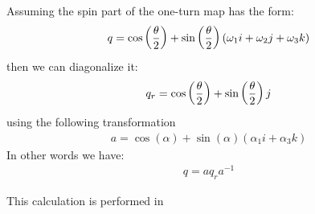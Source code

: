 \documentclass{hitec}     %
\begin{document}
{{{{{{Assuming the spin part of the one-turn map has the form:
%
\begin{align} q=
\cos\left({{\theta  \over 2}}\right)+\sin\left({{\theta  \over 2}}\right)\left({{\omega }_{1}i+{\omega }_{2}j+{\omega }_{3}k}\right) \label{eq:quatmap}\end{align}
then we can diagonalize it:
%
\begin{align} {q}_{r}=
\cos\left({{\theta  \over 2}}\right)+\sin\left({{\theta  \over 2}}\right)j \label{eq:quatmapj}\end{align}
using the following transformation
%
\begin{align} a=
\cos\left({\alpha }\right)+\sin\left({\alpha }\right)\left({{\alpha }_{1}i+{\alpha }_{3}k}\right) \label{eq:quas}\end{align}
In other words we have:
%
\begin{align} q=
a{q}_{r}{a}^{-1} \end{align}

This calculation is performed in \vn{c_normal_spin_linear_quaternion(m1,m1,n%

In FPP, as displayed in \Eq{eq:quatmapj}, the normal axis of the normal form is $j$, i.e., the vertical axis. This makes sense to the extent that most rings are planar.




\subsection{The nonlinear algorithm}\label{s:nonlinearnorm}

}}}}}}}
\end{document}

